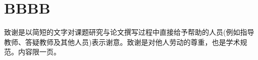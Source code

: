 \documentclass[type = master,class = academic]{whu-thesis}
\begin{document}

\tableofcontents %


\mainmatter


\chapter{BBBB}


\printbibliography

% 

\begin{acknowledgements}
  致谢是以简短的文字对课题研究与论文撰写过程中直接给予帮助的人员(例如指导教师、答疑教师及其他人员)表示谢意。致谢是对他人劳动的尊重，也是学术规范。内容限一页。
\end{acknowledgements}

\appendix


\end{document}
